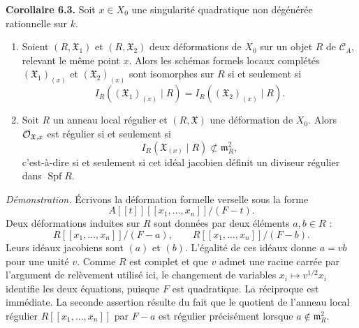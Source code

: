 \documentclass[11pt]{article}
\providecommand{\Spf}{\operatorname{Spf}}
\begin{document}
\textbf{Corollaire 6.3.}  Soit \(x\in X_0\) une singularité quadratique non dégénérée rationnelle sur \(k\).
\begin{enumerate}[label=(\arabic*)]
\item Soient \((R,\mathfrak X_1)\) et \((R,\mathfrak X_2)\) deux déformations de \(X_0\) sur un objet \(R\) de \(\mathcal C_A\), relevant le même point \(x\).  Alors les schémas formels locaux complétés \((\mathfrak X_1)_{(x)}\) et \((\mathfrak X_2)_{(x)}\) sont isomorphes sur \(R\) si et seulement si
\[
        I_R((\mathfrak X_1)_{(x)}\mid R)
        =
        I_R((\mathfrak X_2)_{(x)}\mid R).
\]
\item Soit \(R\) un anneau local régulier et \((R,\mathfrak X)\) une déformation de \(X_0\).  Alors \(\mathcal O_{\mathfrak X,x}\) est régulier si et seulement si
\[
        I_R(\mathfrak X_{(x)}\mid R)\not\subset \mathfrak m_R^2,
\]
c'est-à-dire si et seulement si cet idéal jacobien définit un diviseur régulier dans \(\Spf R\).
\end{enumerate}

\emph{Démonstration.}  Écrivons la déformation formelle verselle sous la forme
\[
        A[[t]][[x_1,\ldots,x_n]]/(F-t).
\]
Deux déformations induites sur \(R\) sont données par deux éléments \(a,b\in R\) :
\[
        R[[x_1,\ldots,x_n]]/(F-a),
        \qquad
        R[[x_1,\ldots,x_n]]/(F-b).
\]
Leurs idéaux jacobiens sont \((a)\) et \((b)\).  L'égalité de ces idéaux donne \(a=vb\) pour une unité \(v\).  Comme \(R\) est complet et que \(v\) admet une racine carrée par l'argument de relèvement utilisé ici, le changement de variables \(x_i\mapsto v^{1/2}x_i\) identifie les deux équations, puisque \(F\) est quadratique.  La réciproque est immédiate.  La seconde assertion résulte du fait que le quotient de l'anneau local régulier \(R[[x_1,\ldots,x_n]]\) par \(F-a\) est régulier précisément lorsque \(a\notin\mathfrak m_R^2\).
\end{document}

